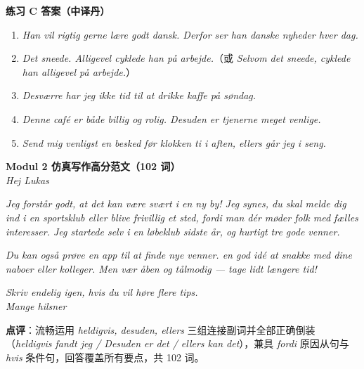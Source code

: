 \begin{answerbox}
\textbf{练习 C 答案（中译丹）}
\begin{enumerate}
  \item \textit{Han vil rigtig gerne lære godt dansk. Derfor ser han danske nyheder hver dag.}
  \item \textit{Det sneede. Alligevel cyklede han på arbejde.}（或 \textit{Selvom det sneede, cyklede han alligevel på arbejde.}）
  \item \textit{Desværre har jeg ikke tid til at drikke kaffe på søndag.}
  \item \textit{Denne café er både billig og rolig. Desuden er tjenerne meget venlige.}
  \item \textit{Send mig venligst en besked før klokken ti i aften, ellers går jeg i seng.}
\end{enumerate}

\textbf{Modul 2 仿真写作高分范文（102 词）}\\
\textit{Hej Lukas}

\textit{Jeg forstår godt, at det kan være svært i en ny by! Jeg synes, du skal melde dig ind i en sportsklub eller blive frivillig et sted, fordi man dér møder folk med fælles interesser. Jeg startede selv i en løbeklub sidste år, og   hurtigt tre gode venner.}

\textit{Du kan også prøve en app til at finde nye venner.   en god idé at snakke med dine naboer eller kolleger. Men vær åben og tålmodig ---   tage lidt længere tid!}

\textit{Skriv endelig igen, hvis du vil høre flere tips.\\
Mange hilsner\\
}

\small\textbf{点评}：流畅运用 \textit{heldigvis, desuden, ellers} 三组连接副词并全部正确倒装（\textit{heldigvis fandt jeg / Desuden er det / ellers kan det}），兼具 \textit{fordi} 原因从句与 \textit{hvis} 条件句，回答覆盖所有要点，共 102 词。
\end{answerbox}
